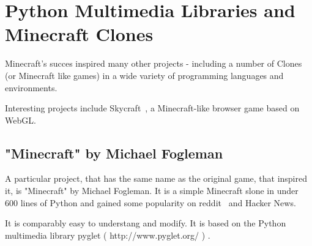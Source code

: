 \section{Python Multimedia Libraries and Minecraft Clones}
Minecraft's succes inspired many other projects - including a number of Clones (or Minecraft like games) in a wide variety of programming languages and environments.

Interesting projects include Skycraft~\cite{skycraft}, a Minecraft-like browser game based on WebGL.

        \subsection{"Minecraft" by Michael Fogleman}
A particular project, that has the same name as the original game, that inspired it, is "Minecraft" by Michael Fogleman. It is a simple Minecraft slone in under 600 lines of Python and gained some popularity on reddit~\cite{fogle-reddit} and Hacker News.~\cite{fogle_hn}

It is comparably easy to understang and modify. It is based on the Python multimedia library pyglet ( http://www.pyglet.org/ ) .


